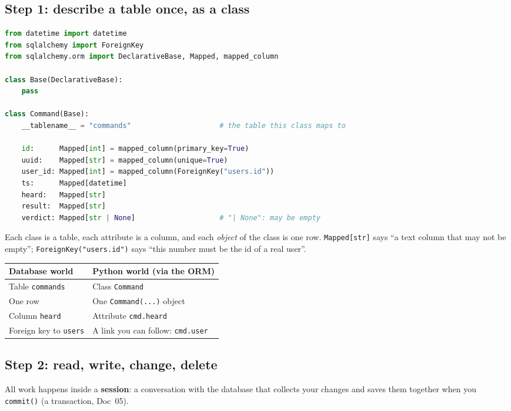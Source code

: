 \documentclass[11pt,a4paper]{article}
\begin{document}
\subsection{Step 1: describe a table once, as a class}
\begin{lstlisting}[language=Python]
from datetime import datetime
from sqlalchemy import ForeignKey
from sqlalchemy.orm import DeclarativeBase, Mapped, mapped_column

class Base(DeclarativeBase):
    pass

class Command(Base):
    __tablename__ = "commands"                     # the table this class maps to

    id:      Mapped[int] = mapped_column(primary_key=True)
    uuid:    Mapped[str] = mapped_column(unique=True)
    user_id: Mapped[int] = mapped_column(ForeignKey("users.id"))
    ts:      Mapped[datetime]
    heard:   Mapped[str]
    result:  Mapped[str]
    verdict: Mapped[str | None]                    # "| None": may be empty
\end{lstlisting}

\noindent Each class is a table, each attribute is a column, and each \emph{object} of the class
is one row. \texttt{Mapped[str]} says ``a text column that may not be empty'';
\texttt{ForeignKey("users.id")} says ``this number must be the id of a real user''.

\begin{center}
\renewcommand{\arraystretch}{1.2}
\begin{tabularx}{\textwidth}{l X}
\toprule
\textbf{Database world} & \textbf{Python world (via the ORM)} \\
\midrule
Table \texttt{commands} & Class \texttt{Command} \\
One row & One \texttt{Command(...)} object \\
Column \texttt{heard} & Attribute \texttt{cmd.heard} \\
Foreign key to \texttt{users} & A link you can follow: \texttt{cmd.user} \\
\bottomrule
\end{tabularx}
\end{center}

\subsection{Step 2: read, write, change, delete}
All work happens inside a \textbf{session}: a conversation with the database that collects your
changes and saves them together when you \texttt{commit()} (a transaction, Doc~05).
\end{document}

